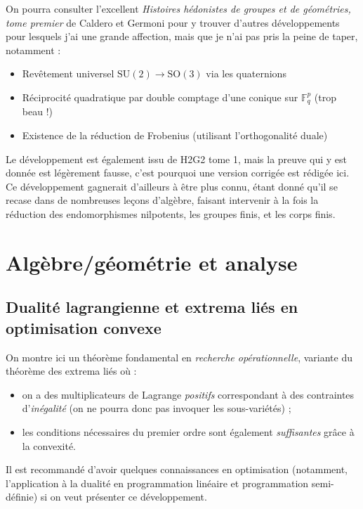 \documentclass[a4paper, 11pt]{article}
\def\F{\mathbb{F}}
\begin{document}
On pourra consulter l'excellent \emph{Histoires hédonistes de groupes et de
  géométries, tome premier} de Caldero et Germoni pour y trouver d'autres
développements pour lesquels j'ai une grande affection, mais que je n'ai pas
pris la peine de taper, notamment :
\begin{itemize}
\item Revêtement universel $\mathrm{SU}(2) \to \mathrm{SO}(3)$ via les
  quaternions
\item Réciprocité quadratique par double comptage d'une conique sur $\F_q^p$
  (trop beau !)
\item Existence de la réduction de Frobenius (utilisant l'orthogonalité duale)
\end{itemize}
Le développement  est également issu de H2G2 tome 1, mais la
preuve qui y est donnée est légèrement fausse, c'est pourquoi une version
corrigée est rédigée ici. Ce développement gagnerait d'ailleurs à être plus
connu, étant donné qu'il se recase dans de nombreuses leçons d'algèbre, faisant
intervenir à la fois la réduction des endomorphismes nilpotents, les groupes
finis, et les corps finis.

\newpage

\tableofcontents

\newpage

\section{Algèbre/géométrie et analyse}

\subsection{Dualité lagrangienne et extrema liés en optimisation convexe}
\label{dual}

On montre ici un théorème fondamental en \emph{recherche opérationnelle},
variante du théorème des extrema liés où :
\begin{itemize}
\item on a des multiplicateurs de Lagrange \emph{positifs} correspondant à des
  contraintes d'\emph{inégalité} (on ne pourra donc pas invoquer les
  sous-variétés) ;
\item les conditions nécessaires du premier ordre sont également
  \emph{suffisantes} grâce à la convexité.
\end{itemize}
Il est recommandé d'avoir quelques connaissances en optimisation
(notamment, l'application à la dualité en programmation linéaire et
programmation semi-définie) si on veut présenter ce développement.
\end{document}

